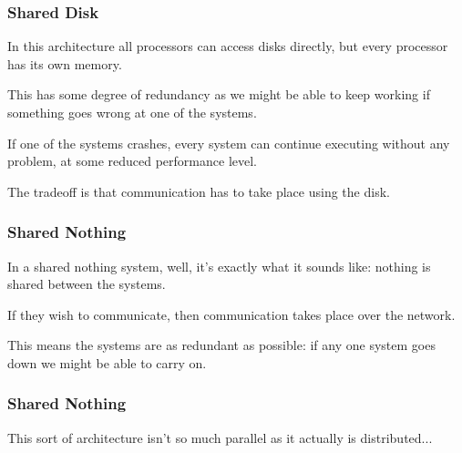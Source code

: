 \begin{frame}
\frametitle{Shared Disk}

In this architecture all processors can access disks directly, but every processor has its own memory. 

This has some degree of redundancy as we might be able to keep working if something goes wrong at one of the systems. 

If one of the systems crashes, every system can continue executing without any problem, at some reduced performance level. 

The tradeoff is that communication has to take place using the disk.

\end{frame}

\begin{frame}
\frametitle{Shared Nothing}

In a shared nothing system, well, it's exactly what it sounds like: nothing is shared between the systems. 

If they wish to communicate, then communication takes place over the network. 

This means the systems are as redundant as possible: if any one system goes down we might be able to carry on. 

\end{frame}

\begin{frame}
\frametitle{Shared Nothing}

This sort of architecture isn't so much parallel as it actually is \alert{distributed}...


\end{frame}




